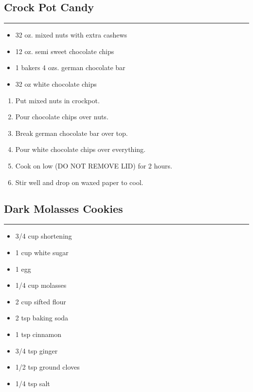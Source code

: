 \documentclass{article}
\begin{document}
\subsection{Crock Pot Candy} 
\noindent\rule[0.5ex]{\linewidth}{1pt}

\begin{framed}
    \begin{itemize}
        \item 32 oz. mixed nuts with extra cashews 
        \item 12 oz. semi sweet chocolate chips 
        \item 1 bakers 4 ozs. german chocolate bar
        \item 32 oz white chocolate chips
    \end{itemize}
\end{framed}

\begin{enumerate}
    \item 
        Put mixed nuts in crockpot. 
    \item 
        Pour chocolate chips over nuts.
    \item 
        Break german chocolate bar over top.
    \item 
        Pour white chocolate chips over everything.
    \item 
        Cook on low (DO NOT REMOVE LID) for 2 hours.
    \item 
        Stir well and drop on waxed paper to cool.
\end{enumerate}
\newpage

\subsection{Dark Molasses Cookies} 
\noindent\rule[0.5ex]{\linewidth}{1pt}

\begin{framed}
\begin{itemize}
    \item 3/4 cup shortening
    \item 1 cup white sugar
    \item 1 egg
    \item 1/4 cup molasses
    \item 2 cup sifted flour
    \item 2 tsp baking soda
    \item 1 tsp cinnamon
    \item 3/4 tsp ginger
    \item 1/2 tsp ground cloves
    \item 1/4 tsp salt
\end{itemize}
\end{framed}
\end{document}
